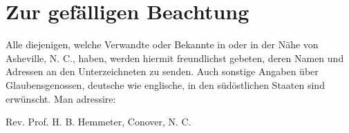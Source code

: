 \chapter{Zur gefälligen Beachtung}

Alle diejenigen, welche Verwandte oder Bekannte in oder in der Nähe von Asheville, N. C., haben, werden hiermit freundlichst gebeten, deren Namen und Adressen an den Unterzeichneten zu senden. Auch sonstige Angaben über Glaubensgenossen, deutsche wie englische, in den südöstlichen Staaten sind erwünscht. Man adressire:

Rev. Prof. H. B. Hemmeter,
Conover, N. C.
